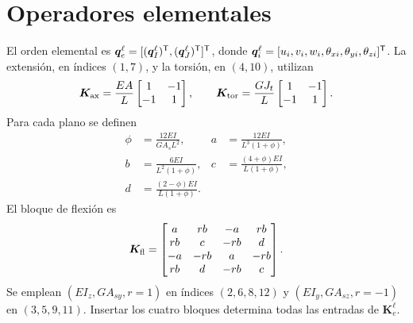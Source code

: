 \section{Operadores elementales}\label{ap:elemento}

El orden elemental es $\bm q_e^\ell=[(\bm q_I^\ell)^\mathsf T,(\bm q_J^\ell)^\mathsf T]^\mathsf T$, donde $\bm q_i^\ell=[u_i,v_i,w_i,\theta_{xi},\theta_{yi},\theta_{zi}]^\mathsf T$. La extensión, en índices $(1,7)$, y la torsión, en $(4,10)$, utilizan
\begin{equation}
\bm K_{\rm ax}=\frac{EA}{L}\begin{bmatrix}1&-1\\-1&1\end{bmatrix},\qquad
\bm K_{\rm tor}=\frac{GJ_t}{L}\begin{bmatrix}1&-1\\-1&1\end{bmatrix}.
\end{equation}
Para cada plano se definen
\begin{align}
\phi&=\frac{12EI}{GA_sL^2},&a&=\frac{12EI}{L^3(1+\phi)},\nonumber\\
b&=\frac{6EI}{L^2(1+\phi)},&c&=\frac{(4+\phi)EI}{L(1+\phi)},\nonumber\\
d&=\frac{(2-\phi)EI}{L(1+\phi)}.
\end{align}
El bloque de flexión es
\begin{equation}
\bm K_{\rm fl}=\begin{bmatrix}
a&rb&-a&rb\\rb&c&-rb&d\\-a&-rb&a&-rb\\rb&d&-rb&c
\end{bmatrix}.
\end{equation}
Se emplean $(EI_z,GA_{sy},r=1)$ en índices $(2,6,8,12)$ y $(EI_y,GA_{sz},r=-1)$ en $(3,5,9,11)$. Insertar los cuatro bloques determina todas las entradas de $\bm K_e^\ell$.

